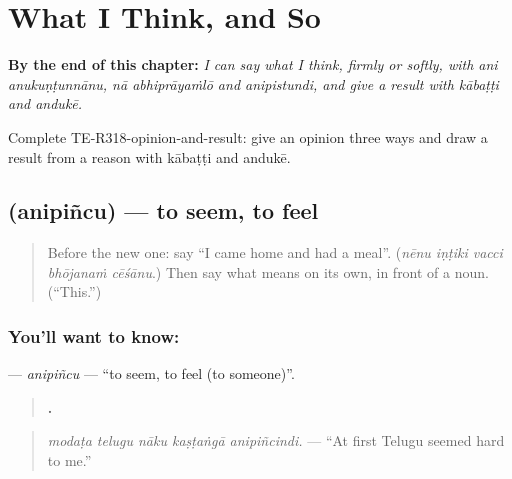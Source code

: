 
\chapter{What I Think, and So}
\label{ch:te-what-i-think-and-so}

\begin{chapteropening}
\textbf{By the end of this chapter:} \emph{I can say what I think, firmly or softly, with ani anukuṇṭunnānu, nā abhiprāyaṁlō and anipistundi, and give a result with kābaṭṭi and andukē.}

Complete TE-R318-opinion-and-result: give an opinion three ways and draw a result from a reason with kābaṭṭi and andukē.
\end{chapteropening}

\section[\texorpdfstring{\te{అనిపించు} (anipiñcu)}{అనిపించు (anipiñcu)}]{ (anipiñcu) — to seem, to feel}

\label{lesson:TE-C318-anipincu}



\begin{quote}
Before the new one: say \textquotedblleft{}I came home and had a meal\textquotedblright{}. (\emph{nēnu iṇṭiki vacci bhōjanaṁ cēśānu}.) Then say what \textbf{} means on its own, in front of a noun. (\textquotedblleft{}This.\textquotedblright{})
\end{quote}

\subsection*{You'll want to know: }
\textbf{} — \emph{anipiñcu} — \textquotedblleft{}to seem, to feel (to someone)\textquotedblright{}.

\begin{quote}
\textbf{    .}
\end{quote}

\begin{quote}
\emph{modaṭa telugu nāku kaṣṭaṅgā anipiñcindi.} — \textquotedblleft{}At first Telugu seemed hard to me.\textquotedblright{}
\end{quote}

